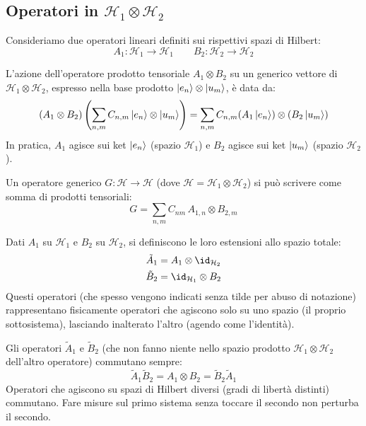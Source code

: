 \subsection{Operatori in \texorpdfstring{\(\mathcal{H}_1\otimes\mathcal{H}_2\)}{H1⊗H2}}

Consideriamo due operatori lineari definiti sui rispettivi spazi di Hilbert:
\[
    A_1: \mathcal{H}_1 \to \mathcal{H}_1 \qquad B_2: \mathcal{H}_2 \to \mathcal{H}_2
\]

L'azione dell'operatore prodotto tensoriale \(A_1 \otimes B_2\) su un generico vettore di \(\mathcal{H}_1 \otimes \mathcal{H}_2\), espresso nella base prodotto \(\ket{e_n} \otimes \ket{u_m}\), è data da:
\begin{equation}
    (A_1 \otimes B_2) \left( \sum_{n,m} C_{n,m} \ket{e_n} \otimes \ket{u_m} \right) = \sum_{n,m} C_{n,m} (A_1\ket{e_n}) \otimes (B_2\ket{u_m})
\end{equation}
In pratica, \(A_1\) agisce sui ket \(\ket{e_n}\) (spazio \(\mathcal{H}_1\)) e \(B_2\) agisce sui ket \(\ket{u_m}\) (spazio \(\mathcal{H}_2\)).

Un operatore generico \(G: \mathcal{H} \to \mathcal{H}\) (dove \(\mathcal{H} = \mathcal{H}_1 \otimes \mathcal{H}_2\)) si può scrivere come somma di prodotti tensoriali:
\begin{equation}
    G = \sum_{n,m} C_{nm} \, A_{1,n} \otimes B_{2,m}
\end{equation}

Dati \(A_1\) su \(\mathcal{H}_1\) e \(B_2\) su \(\mathcal{H}_2\), si definiscono le loro estensioni allo spazio totale:
\begin{align}
    \tilde{A}_1 &= A_1 \otimes \id_{\mathcal{H}_2} \\
    \tilde{B}_2 &= \id_{\mathcal{H}_1} \otimes B_2
\end{align}
Questi operatori (che spesso vengono indicati senza tilde per abuso di notazione) rappresentano fisicamente operatori che agiscono solo su uno spazio (il proprio sottosistema), lasciando inalterato l'altro (agendo come l'identità).

\begin{remark}
    Gli operatori \(\tilde{A}_1\) e \(\tilde{B}_2\) (che non fanno niente nello spazio prodotto \(\mathcal{H}_1 \otimes \mathcal{H}_2\) dell'altro operatore) commutano sempre:
    \begin{equation}
        \tilde{A}_1 \tilde{B}_2 = A_1 \otimes B_2 = \tilde{B}_2 \tilde{A}_1
    \end{equation}
    Operatori che agiscono su spazi di Hilbert diversi (gradi di libertà distinti) commutano. Fare misure sul primo sistema senza toccare il secondo non perturba il secondo.
\end{remark}

